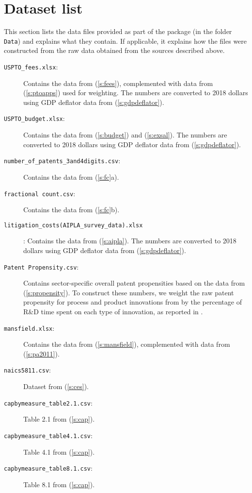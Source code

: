\documentclass[a4paper,11pt]{article}
\begin{document}
\section{Dataset list} \label{sec:datafiles}

This section lists the data files provided as part of the package (in the folder \texttt{Data}) and explains what they contain. If applicable, it explains how the files were constructed from the raw data obtained from the sources described above.

\begin{description}
  \item[\texttt{USPTO_fees.xlsx}:] Contains the data from (\ref{s:fees}), complemented with data from (\ref{s:ptoapps}) used for weighting. The numbers are converted to 2018 dollars using GDP deflator data from (\ref{s:gdpdeflator}).
  \item[\texttt{USPTO_budget.xlsx}:] Contains the data from (\ref{s:budget}) and (\ref{s:exsal}). The numbers are converted to 2018 dollars using GDP deflator data from (\ref{s:gdpdeflator}).
  \item[\texttt{number_of_patents_3and4digits.csv}:] Contains the data from (\ref{s:fc}a).
  \item[\texttt{fractional count.csv}:] Contains the data from (\ref{s:fc}b).
  \item[\texttt{litigation_costs(AIPLA_survey_data).xlsx}]: Contains the data from (\ref{s:aipla}). The numbers are converted to 2018 dollars using GDP deflator data from (\ref{s:gdpdeflator}).
  \item[\texttt{Patent Propensity.csv}:] Contains sector-specific overall patent propensities based on the data from (\ref{s:propensity}). To construct these numbers, we weight the raw patent propensity for process and product innovations from \citet[Table A1, p.~49]{CoNW00} by the percentage of R\&D time spent on each type of innovation, as reported in \citet[Table 1, p.~133]{ArK98}.
  \item[\texttt{mansfield.xlsx}:] Contains the data from (\ref{s:mansfield}), complemented with data from (\ref{s:pa2011}).
  \item[\texttt{naics5811.csv}:] Dataset from (\ref{s:ces}).
  \item[\texttt{capbymeasure_table2.1.csv}:] Table 2.1 from (\ref{s:cap}).
  \item[\texttt{capbymeasure_table4.1.csv}:] Table 4.1 from (\ref{s:cap}).
  \item[\texttt{capbymeasure_table8.1.csv}:] Table 8.1 from (\ref{s:cap}).

\end{description}
\end{document}
